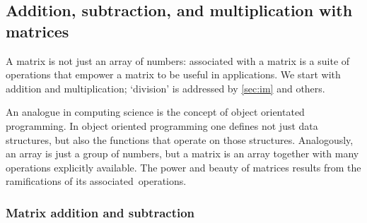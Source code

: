 \subsection{Addition, subtraction, and multiplication with matrices}
\label{sec:amwm}

A matrix is not just an array of numbers: associated with a matrix is a suite of operations that empower a matrix to be useful in applications.
We start with addition and multiplication; `division' is addressed by \cref{sec:im} and others.

An analogue in computing science is the concept of object orientated programming.
In object oriented programming one defines not just data structures, but also the functions that operate on those structures.
Analogously, an array is just a group of numbers, but a matrix is an array together with many operations explicitly available. 
The power and beauty of matrices results from the ramifications of its associated~operations.


\subsubsection{Matrix addition and subtraction}

